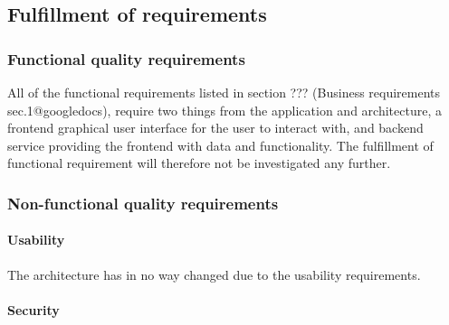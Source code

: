\subsection{Fulfillment of requirements}

\subsubsection{Functional quality requirements}
All of the functional requirements listed in section ??? (Business requirements sec.1@googledocs), require two things from the application and architecture, a frontend graphical user interface for the user to interact with, and backend service providing the frontend with data and functionality. The fulfillment of functional requirement will therefore not be investigated any further.

\subsubsection{Non-functional quality requirements}

\paragraph{Usability}
The architecture has in no way changed due to the usability requirements. 

\paragraph{Security}

